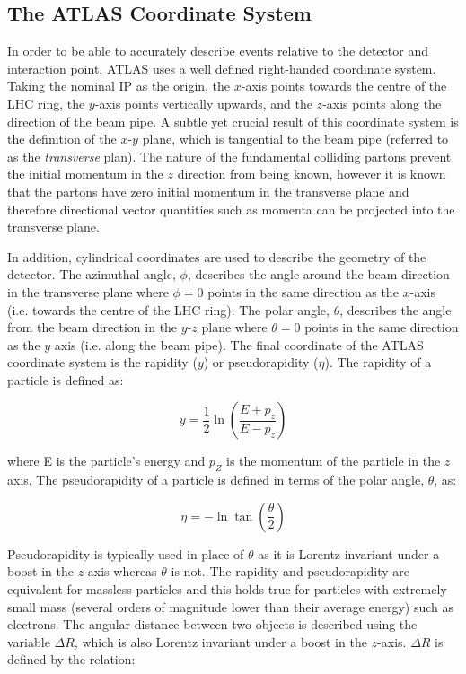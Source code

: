 \documentclass[12pt,a4paper,epsf,portrait,times,epsfig]{report}
\begin{document}
		\subsection{The ATLAS Coordinate System}

		In order to be able to accurately describe events relative to the detector and interaction point, ATLAS uses a well defined right-handed coordinate system. Taking the nominal IP as the origin, the $x$-axis points towards the centre of the LHC ring, the $y$-axis points vertically upwards, and the $z$-axis points along the direction of the beam pipe. A subtle yet crucial result of this coordinate system is the definition of the $x$-$y$ plane, which is tangential to the beam pipe (referred to as the \textit{transverse} plan). The nature of the fundamental colliding partons prevent the initial momentum in the $z$ direction from being known, however it is known that the partons have zero initial momentum in the transverse plane and therefore directional vector quantities such as momenta can be projected into the transverse plane. \par

		In addition, cylindrical coordinates are used to describe the geometry of the detector. The azimuthal angle, $\phi$, describes the angle around the beam direction in the transverse plane where $\phi = 0$ points in the same direction as the $x$-axis (i.e. towards the centre of the LHC ring). The polar angle, $\theta$, describes the angle from the beam direction in the $y$-$z$ plane where $\theta = 0$ points in the same direction as the $y$ axis (i.e. along the beam pipe). The final coordinate of the ATLAS coordinate system is the rapidity ($y$) or pseudorapidity ($\eta$). The rapidity of a particle is defined as: 

		\begin{equation}
			y = \frac{1}{2}\ln\left(\frac{E+p_{z}}{E-p_{z}}\right)
		\end{equation}

		where E is the particle's energy and $p_{Z}$ is the momentum of the particle in the $z$ axis. The pseudorapidity of a particle is defined in terms of the polar angle, $\theta$, as:

		\begin{equation}
			\eta = -\ln\tan\left(\frac{\theta}{2}\right)
		\end{equation}

		Pseudorapidity is typically used in place of $\theta$ as it is Lorentz invariant under a boost in the $z$-axis whereas $\theta$ is not. The rapidity and pseudorapidity are equivalent for massless particles and this holds true for particles with extremely small mass (several orders of magnitude lower than their average energy) such as electrons. The angular distance between two objects is described using the variable $\Delta R$, which is also Lorentz invariant under a boost in the $z$-axis. $\Delta R$ is defined by the relation:
\end{document}
